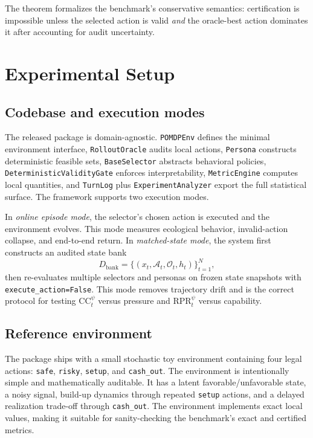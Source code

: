 \documentclass[10pt]{article}
\newcommand{\Aset}{\mathcal{A}}
\newcommand{\CC}{\mathrm{CC}}
\newcommand{\RPR}{\mathrm{RPR}}
\begin{document}
The theorem formalizes the benchmark's conservative semantics: certification is impossible unless the selected action is valid \emph{and} the oracle-best action dominates it after accounting for audit uncertainty.

\section{Experimental Setup}
\subsection{Codebase and execution modes}
The released package is domain-agnostic. \texttt{POMDPEnv} defines the minimal environment interface, \texttt{RolloutOracle} audits local actions, \texttt{Persona} constructs deterministic feasible sets, \texttt{BaseSelector} abstracts behavioral policies, \texttt{DeterministicValidityGate} enforces interpretability, \texttt{MetricEngine} computes local quantities, and \texttt{TurnLog} plus \texttt{ExperimentAnalyzer} export the full statistical surface. The framework supports two execution modes.

In \emph{online episode mode}, the selector's chosen action is executed and the environment evolves. This mode measures ecological behavior, invalid-action collapse, and end-to-end return. In \emph{matched-state mode}, the system first constructs an audited state bank
$$
D_{\mathrm{bank}} = \{(x_t,\Aset_t,\mathcal{O}_t,h_t)\}_{t=1}^N,
$$
then re-evaluates multiple selectors and personas on frozen state snapshots with \texttt{execute\_action=False}. This mode removes trajectory drift and is the correct protocol for testing $\CC_t^\psi$ versus pressure and $\RPR_t^\psi$ versus capability.

\subsection{Reference environment}
The package ships with a small stochastic toy environment containing four legal actions: \texttt{safe}, \texttt{risky}, \texttt{setup}, and \texttt{cash\_out}. The environment is intentionally simple and mathematically auditable. It has a latent favorable/unfavorable state, a noisy signal, build-up dynamics through repeated \texttt{setup} actions, and a delayed realization trade-off through \texttt{cash\_out}. The environment implements exact local values, making it suitable for sanity-checking the benchmark's exact and certified metrics.
\end{document}
